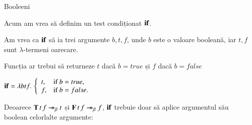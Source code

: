 \documentclass[xcolor=pdftex,romanian,colorlinks]{beamer}
\begin{document}
\begin{frame}{Booleeni}

\begin{center}
  \hspace{1cm} 
\end{center}

\vspace{-.2cm}
Acum am vrea să definim un test condiționat $\mathbf{if}$. 

Am vrea ca $\mathbf{if}$ să ia trei argumente $b,t,f$, unde $b$ este o valoare booleană, iar $t,f$ sunt $\lambda$-termeni oarecare. 

Funcția ar trebui să returneze $t$ dacă $b = true$ și $f$ dacă $b = false$
\begin{center}
$\mathbf{if} = \lambda btf.\,\left\{ \begin{array}{ll}
         t, & \mbox{if $b = true$},\\
        f, & \mbox{if $b = false$}.\end{array} \right.$
\end{center}

Deoarece $\mathbf{T}\, t\, f \twoheadrightarrow_\beta t$ și $\mathbf{F}\, t\, f \twoheadrightarrow_\beta f$, $\mathbf{if}$ trebuie doar să aplice argumentul său boolean celorlalte argumente:
\begin{center}
\end{center}
\end{frame}
\end{document}
